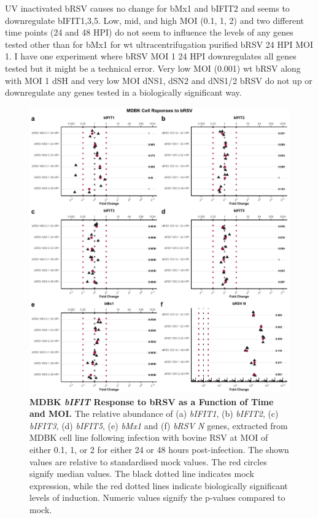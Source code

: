 UV inactivated bRSV causes no change for bMx1 and bIFIT2 and seems to downregulate bIFIT1,3,5. Low, mid, and high MOI (0.1, 1, 2) and two different time points (24 and 48 HPI) do not seem to influence the levels of any genes tested other than for bMx1 for wt ultracentrifugation purified bRSV 24 HPI MOI 1. I have one experiment where bRSV MOI 1 24 HPI downregulates all genes tested but it might be a technical error. 
Very low MOI (0.001) wt bRSV along with MOI 1 dSH and very low MOI dNS1, dSN2 and dNS1/2 bRSV do not up or downregulate any genes tested in a biologically significant way.

\begin{figure}
    \centering
    \includegraphics[width=1\linewidth]{07. Chapter 2/Figs/02. Induction/03. mdbk_brsv_timepoints.pdf}
    \caption[MDBK \textit{bIFIT} Response to bRSV as a Function of Time and MOI.]{\textbf{MDBK \textit{bIFIT} Response to bRSV as a Function of Time and MOI.} The relative abundance of (a) \textit{bIFIT1}, (b) \textit{bIFIT2}, (c) \textit{bIFIT3}, (d) \textit{bIFIT5}, (e) \textit{bMx1} and (f) \textit{bRSV N} genes, extracted from MDBK cell line following infection with bovine RSV at MOI of either 0.1, 1, or 2 for either 24 or 48 hours post-infection. The shown values are relative to standardised mock values. The red circles signify median values. The black dotted line indicates mock expression, while the red dotted lines indicate biologically significant levels of induction. Numeric values signify the p-values compared to mock.}
    \label{fig:MDBK responses to bRSV timepoints}
\end{figure}

